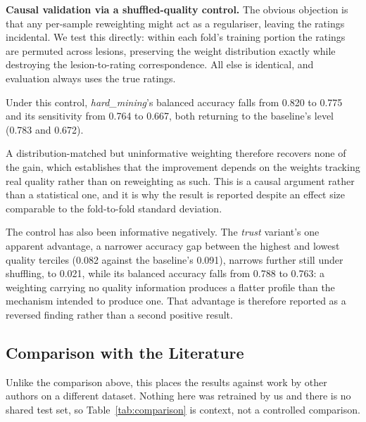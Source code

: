 \documentclass[conference]{IEEEtran}
\begin{document}
\smallskip\noindent\textbf{Causal validation via a shuffled-quality control.}
\label{sec:shuffle}
The obvious objection is that any per-sample reweighting might act as a regulariser, leaving the ratings incidental. We test this directly: within each fold's training portion the ratings are permuted across lesions, preserving the weight distribution exactly while destroying the lesion-to-rating correspondence. All else is identical, and evaluation always uses the true ratings.

Under this control, \emph{hard\_mining}'s balanced accuracy falls from 0.820 to 0.775 and its sensitivity from 0.764 to 0.667, both returning to the baseline's level (0.783 and 0.672).

A distribution-matched but uninformative weighting therefore recovers none of the gain, which establishes that the improvement depends on the weights tracking real quality rather than on reweighting as such. This is a causal argument rather than a statistical one, and it is why the result is reported despite an effect size comparable to the fold-to-fold standard deviation.

The control has also been informative negatively. The \emph{trust} variant's one apparent advantage, a narrower accuracy gap between the highest and lowest quality terciles (0.082 against the baseline's 0.091), narrows further still under shuffling, to 0.021, while its balanced accuracy falls from 0.788 to 0.763: a weighting carrying no quality information produces a flatter profile than the mechanism intended to produce one. That advantage is therefore reported as a reversed finding rather than a second positive result.

\subsection{Comparison with the Literature}
\label{sec:comparison}
Unlike the comparison above, this places the results against work by other authors on a different dataset. Nothing here was retrained by us and there is no shared test set, so Table~\ref{tab:comparison} is context, not a controlled comparison.
\end{document}
